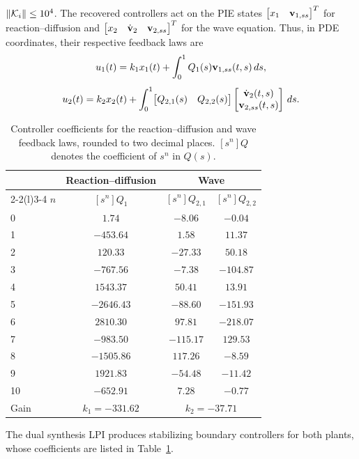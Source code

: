 $\|\mathcal{K}_i\|\leq10^4$.
The recovered controllers act on the PIE
states $\begin{bmatrix}x_1&\mathbf{v}_{1,ss}\end{bmatrix}^T$ for reaction--diffusion and
$\begin{bmatrix}x_2&\dot{\mathbf{v}}_{2}&\mathbf{v}_{2,ss}\end{bmatrix}^T$ for the wave equation. Thus, in PDE
coordinates, their respective feedback laws are
\begin{equation*}
 \begin{gathered}
 u_1(t)=k_1x_1(t)+\int_0^1 Q_1(s)\mathbf{v}_{1,ss}(t,s)\,ds,\\[4pt]
 u_2(t)=k_2x_2(t)+\int_0^1\!\begin{bmatrix}Q_{2,1}(s)&Q_{2,2}(s)\end{bmatrix}
             \begin{bmatrix}\dot{\mathbf{v}}_{2}(t,s)\\\mathbf{v}_{2,ss}(t,s)\end{bmatrix}\,ds.
 \end{gathered}
\end{equation*}
\begin{table}[t]
 \centering
 \caption{Controller coefficients for the reaction--diffusion and wave
 feedback laws, rounded to two decimal places. $[s^n]Q$ denotes the coefficient
 of $s^n$ in $Q(s)$.}
 \label{tab:wave-controller-coefficients}
 \small
 \begin{tabular}{@{}lccc@{}}
  \toprule
  & Reaction--diffusion & \multicolumn{2}{c}{Wave}\\
  \cmidrule(lr){2-2}\cmidrule(l){3-4}
  $n$ & $[s^n]Q_1$ & $[s^n]Q_{2,1}$ & $[s^n]Q_{2,2}$\\
  \midrule
  0 & $1.74$ & $-8.06$ & $-0.04$\\
  1 & $-453.64$ & $1.58$ & $11.37$\\
  2 & $120.33$ & $-27.33$ & $50.18$\\
  3 & $-767.56$ & $-7.38$ & $-104.87$\\
  4 & $1543.37$ & $50.41$ & $13.91$\\
  5 & $-2646.43$ & $-88.60$ & $-151.93$\\
  6 & $2810.30$ & $97.81$ & $-218.07$\\
  7 & $-983.50$ & $-115.17$ & $129.53$\\
  8 & $-1505.86$ & $117.26$ & $-8.59$\\
  9 & $1921.83$ & $-54.48$ & $-11.42$\\
  10 & $-652.91$ & $7.28$ & $-0.77$\\
  \midrule
  Gain & $k_1=-331.62$ & \multicolumn{2}{c}{$k_2={-37.71}$}\\
  \bottomrule
 \end{tabular}
\end{table}
The dual synthesis LPI produces stabilizing boundary controllers for both
plants, whose coefficients are listed in Table~\ref{tab:wave-controller-coefficients}.
